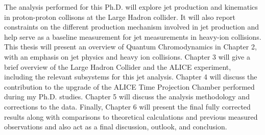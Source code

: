 \par
The analysis performed for this Ph.D. will explore jet production and kinematics in proton-proton collisons at the Large Hadron collider.  It will also report constraints on the different production mechanism involved in jet production and help serve as a baseline measurement for jet measurements in heavy-ion collisions.
This thesis will present an overview of Quantum Chromodynamics in Chapter 2, with an emphasis on jet physics and heavy ion collisions.  Chapter 3 will give a brief overview of the Large Hadron Collider and the ALICE experiment, including the relevant subsystems for this jet analysis.  Chapter 4 will discuss the contribution to the upgrade of the ALICE Time Projection Chamber performed during my Ph.D. studies.  Chapter 5 will discuss the analysis methodology and corrections to the data.  Finally, Chapter 6 will present the final fully corrected results along with comparisons to theoretical calculations and previous measured observations and also act as a final discussion, outlook, and conclusion. 